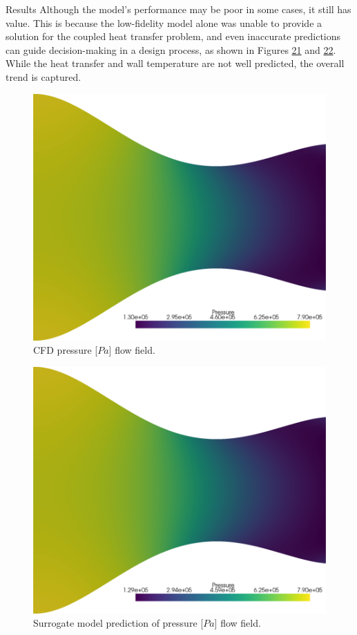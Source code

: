 \begin{frame}{Results}
Although the model's performance may be poor in some cases, it still has
value. This is because the low-fidelity model alone was unable to
provide a solution for the coupled heat transfer problem, and even
inaccurate predictions can guide decision-making in a design process, as
shown in Figures \protect\hyperlink{fig:wall_heat_flux}{21} and
\protect\hyperlink{fig:wall_temperature_solid_wall}{22}. While the heat
transfer and wall temperature are not well predicted, the overall trend
is captured.

\begin{figure}
\hypertarget{fig:cfd_pressure}{%
\centering
\includegraphics{figures/Pressure_field_cfd.png}
\caption{CFD pressure {[}\(Pa\){]} flow field.}\label{fig:cfd_pressure}
}
\end{figure}

\begin{figure}
\hypertarget{fig:prediction_pressure}{%
\centering
\includegraphics{figures/Pressure_field_reconstructed.png}
\caption{Surrogate model prediction of pressure {[}\(Pa\){]} flow
field.}\label{fig:prediction_pressure}
}
\end{figure}


\end{frame}

